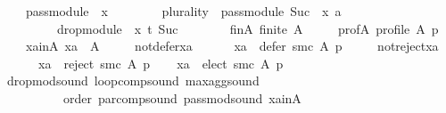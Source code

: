 \begin{isabellebody}
\ \ \ \ {\isachardoublequoteopen}pass{\isacharunderscore}{\kern0pt}module\ {}\ x\ {\isasymtriangleright}\isanewline
\ \ \ \ \ \ \ {\isacharparenleft}{\kern0pt}{\isacharparenleft}{\kern0pt}plurality{\isasymdown}{\isacharparenright}{\kern0pt}\ {\isasymtriangleright}\ pass{\isacharunderscore}{\kern0pt}module\ {\isacharparenleft}{\kern0pt}Suc\ {}{\isacharparenright}{\kern0pt}\ x{\isacharparenright}{\kern0pt}\ {\isasymparallel}\isactrlsub {\isacharquery}{\kern0pt}a\isanewline
\ \ \ \ \ \ \ \ \ drop{\isacharunderscore}{\kern0pt}module\ {}\ x\ {\isasymcirclearrowleft}\isactrlsub {\isacharquery}{\kern0pt}t\ {\isacharparenleft}{\kern0pt}Suc\ {}{\isacharparenright}{\kern0pt}{\isachardoublequoteclose}\isanewline
\ \ \isamarkupfalse%
\isanewline
\ \ \ \ fin{\isacharunderscore}{\kern0pt}A{\isacharcolon}{\kern0pt}\ {\isachardoublequoteopen}finite\ A{\isachardoublequoteclose}\ \isanewline
\ \ \ \ prof{\isacharunderscore}{\kern0pt}A{\isacharcolon}{\kern0pt}\ {\isachardoublequoteopen}profile\ A\ p{\isachardoublequoteclose}\ \isanewline
\ \ \ \ xa{\isacharunderscore}{\kern0pt}in{\isacharunderscore}{\kern0pt}A{\isacharcolon}{\kern0pt}\ {\isachardoublequoteopen}xa\ {\isasymin}\ A{\isachardoublequoteclose}\ \isanewline
\ \ \ \ not{\isacharunderscore}{\kern0pt}defer{\isacharunderscore}{\kern0pt}xa{\isacharcolon}{\kern0pt}\isanewline
\ \ \ \ \ \ {\isachardoublequoteopen}xa\ {\isasymnotin}\ defer\ {\isacharparenleft}{\kern0pt}{\isacharquery}{\kern0pt}smc{\isacharparenright}{\kern0pt}\ A\ p{\isachardoublequoteclose}\ \isanewline
\ \ \ \ not{\isacharunderscore}{\kern0pt}reject{\isacharunderscore}{\kern0pt}xa{\isacharcolon}{\kern0pt}\isanewline
\ \ \ \ \ \ {\isachardoublequoteopen}xa\ {\isasymnotin}\ reject\ {\isacharparenleft}{\kern0pt}{\isacharquery}{\kern0pt}smc{\isacharparenright}{\kern0pt}\ A\ p{\isachardoublequoteclose}\isanewline
\ \ \isamarkupfalse%
\ {\isachardoublequoteopen}xa\ {\isasymin}\ elect\ {\isacharparenleft}{\kern0pt}{\isacharquery}{\kern0pt}smc{\isacharparenright}{\kern0pt}\ A\ p{\isachardoublequoteclose}\isanewline
\ \ \ \ \isamarkupfalse%
\ drop{\isacharunderscore}{\kern0pt}mod{\isacharunderscore}{\kern0pt}sound\ loop{\isacharunderscore}{\kern0pt}comp{\isacharunderscore}{\kern0pt}sound\ max{\isacharunderscore}{\kern0pt}agg{\isacharunderscore}{\kern0pt}sound\isanewline
\ \ \ \ \ \ \ \ \ \ order\ par{\isacharunderscore}{\kern0pt}comp{\isacharunderscore}{\kern0pt}sound\ pass{\isacharunderscore}{\kern0pt}mod{\isacharunderscore}{\kern0pt}sound\ xa{\isacharunderscore}{\kern0pt}in{\isacharunderscore}{\kern0pt}A\isanewline

\end{isabellebody}
